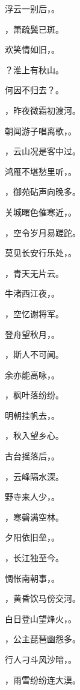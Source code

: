 \documentclass[12pt, a4paper, addpoints, answers]{exam}
\begin{document}
\begin{questions}
\question[3] 浮云一别后，\fillin 。

\question[3] \fillin ，萧疏鬓已斑。

\question[3] 欢笑情如旧，\fillin 。

\question[3] \fillin ？淮上有秋山。

\question[3] 何因不归去？\fillin 。

\question[3] \fillin ，昨夜微霜初渡河。

\question[3] 朝闻游子唱离歌，\fillin 。

\question[3] \fillin ，云山况是客中过。

\question[3] 鸿雁不堪愁里听，\fillin 。

\question[3] \fillin ，御苑砧声向晚多。

\question[3] 关城曙色催寒近，\fillin 。

\question[3] \fillin ，空令岁月易蹉跎。

\question[3] 莫见长安行乐处，\fillin 。

\question[3] \fillin ，青天无片云。

\question[3] 牛渚西江夜，\fillin 。

\question[3] \fillin ，空忆谢将军。

\question[3] 登舟望秋月，\fillin 。

\question[3] \fillin ，斯人不可闻。

\question[3] 余亦能高咏，\fillin 。

\question[3] \fillin ，枫叶落纷纷。

\question[3] 明朝挂帆去，\fillin 。

\question[3] \fillin ，秋入望乡心。

\question[3] 古台摇落后，\fillin 。

\question[3] \fillin ，云峰隔水深。

\question[3] 野寺来人少，\fillin 。

\question[3] \fillin ，寒磬满空林。

\question[3] 夕阳依旧垒，\fillin 。

\question[3] \fillin ，长江独至今。

\question[3] 惆怅南朝事，\fillin 。

\question[3] \fillin ，黄昏饮马傍交河。

\question[3] 白日登山望烽火，\fillin 。

\question[3] \fillin ，公主琵琶幽怨多。

\question[3] 行人刁斗风沙暗，\fillin 。

\question[3] \fillin ，雨雪纷纷连大漠。


\end{questions}
\end{document}
